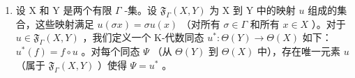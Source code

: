 \begin{enumerate}
\def\labelenumi{\arabic{enumi})}
\setcounter{enumi}{1}
\tightlist
\item
  设 X 和 Y 是两个有限 \(\Gamma\) -集。设 \(\mathfrak{F}_{\Gamma}(X, Y)\) 为 X 到 Y 中的映射 \(u\) 组成的集合，这些映射满足 \(u(\sigma x) = \sigma u(x)\) （对所有 \(\sigma \in \Gamma\) 和所有 \(x \in X\) ）。对于 \(u \in \mathfrak{F}_{\Gamma}(X, Y)\) ，我们定义一个 K-代数同态 \(u^{*}: \Theta(Y) \to \Theta(X)\) 如下： \(u^{*}(f) = f \circ u\) 。对每个同态 \(\Psi\) （从 \(\Theta(Y)\) 到 \(\Theta(X)\) 中），存在唯一元素 \(u\) （属于 \(\mathfrak{F}_{\Gamma}(X, Y)\) ）使得 \(\Psi = u^{*}\) 。
\end{enumerate}

